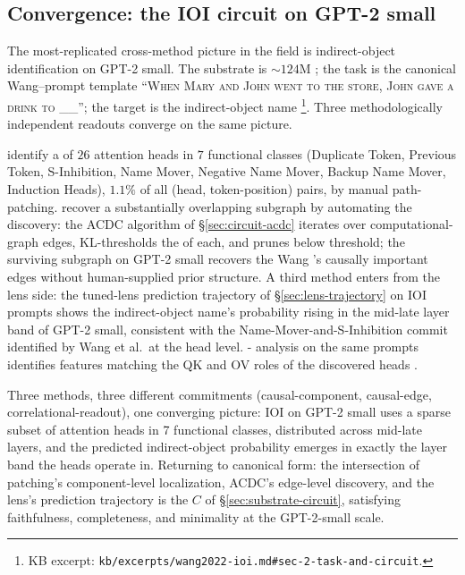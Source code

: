 \subsection{Convergence: the IOI circuit on GPT-2 small}
\label{sec:cross-ioi}

The most-replicated cross-method picture in the field is
indirect-object identification on GPT-2 small. The substrate is
$\sim 124$M ; the task is the canonical Wang--prompt
template ``\textsc{When Mary and John went to the store, John gave a
drink to \_\_}''; the target is the indirect-object name
\citep{wang2022-ioi}\footnote{KB excerpt:
\nolinkurl{kb/excerpts/wang2022-ioi.md#sec-2-task-and-circuit}.}. Three
methodologically independent readouts converge on the same 
picture.

\citet{wang2022-ioi} identify a  of $26$ attention heads in
$7$ functional classes (Duplicate Token, Previous Token,
S-Inhibition, Name Mover, Negative Name Mover, Backup Name Mover,
Induction Heads), $1.1\%$ of all (head, token-position) pairs, by
manual path-patching. \citet{conmy2023-acdc} recover a substantially
overlapping subgraph by automating the discovery: the ACDC
algorithm of \S\ref{sec:circuit-acdc} iterates over
computational-graph edges, KL-thresholds the  of
each, and prunes below threshold; the surviving subgraph on GPT-2
small recovers the Wang 's causally important edges without
human-supplied prior structure. A third method enters from the
lens side: the tuned-lens prediction trajectory of
\S\ref{sec:lens-trajectory} on IOI prompts shows the
indirect-object name's probability rising in the mid-late layer
band of GPT-2 small, consistent with the Name-Mover-and-S-Inhibition
commit identified by Wang et al.\ at the head level. -
analysis on the same prompts identifies features matching the QK
and OV roles of the discovered heads
.

\begin{intuition}
Three methods, three different commitments (causal-component,
causal-edge, correlational-readout), one converging picture: IOI on
GPT-2 small uses a sparse subset of attention heads in 7 functional
classes, distributed across mid-late layers, and the predicted
indirect-object probability emerges in exactly the layer band the
heads operate in. Returning to canonical form: the intersection of
patching's component-level localization, ACDC's edge-level discovery,
and the lens's prediction trajectory is the 
$C$ of \S\ref{sec:substrate-circuit}, satisfying faithfulness,
completeness, and minimality at the GPT-2-small scale.
\end{intuition}

